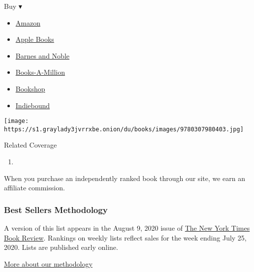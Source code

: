 \begin{enumerate}
  Buy ▾

  \begin{itemize}
  \tightlist
  \item
    \href{http://www.amazon.com/High-Tide-Hawaii-Magic-House/dp/0375806164?tag=NYTBS-20}{Amazon}
  \item
    \href{https://du-gae-books-dot-nyt-du-prd.appspot.com/buy?title=MAGIC+TREE+HOUSE\&author=Mary+Pope+Osborne}{Apple
    Books}
  \item
    \href{https://www.anrdoezrs.net/click-7990613-11819508?url=https\%3A\%2F\%2Fwww.barnesandnoble.com\%2Fw\%2F\%3Fean\%3D9780375813658}{Barnes
    and Noble}
  \item
    \href{https://www.anrdoezrs.net/click-7990613-35140?url=https\%3A\%2F\%2Fwww.booksamillion.com\%2Fp\%2FMAGIC\%2BTREE\%2BHOUSE\%2FMary\%2BPope\%2BOsborne\%2F9780375813658}{Books-A-Million}
  \item
    \href{https://bookshop.org/a/3546/9780375813658}{Bookshop}
  \item
    \href{https://www.indiebound.org/book/9780375813658?aff=NYT}{Indiebound}
  \end{itemize}

  \texttt{[image: https://s1.graylady3jvrrxbe.onion/du/books/images/9780307980403.jpg]}
\end{enumerate}

Related Coverage

\begin{enumerate}
\def\labelenumi{\arabic{enumi}.}
\tightlist
\item
  \href{https://www.nytimes3xbfgragh.onion/2020/07/31/books/review/the-system-robert-reich-break-em-up-zephyr-teachout.html}{}
\end{enumerate}

When you purchase an independently ranked book through our site, we earn
an affiliate commission.

\hypertarget{best-sellers-methodology}{%
\subsubsection{Best Sellers
Methodology}\label{best-sellers-methodology}}

A version of this list appears in the August 9, 2020 issue of
\href{http://www.nytimes3xbfgragh.onion/section/books/review}{The New
York Times Book Review}. Rankings on weekly lists reflect sales for the
week ending July 25, 2020. Lists are published early online.

\href{/books/best-sellers/methodology/}{More about our methodology}


